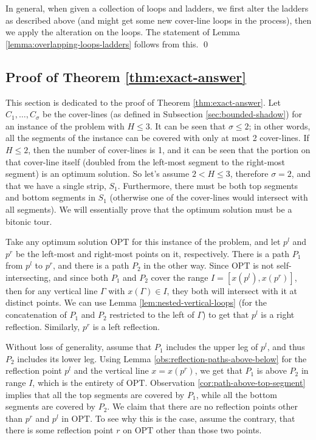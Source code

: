 \documentclass[10pt,a4paper]{amsart}
\theoremstyle{thmstyleone}
\newcommand{\OPT}{{\text{OPT}}}
\begin{document}
    In general, when given a collection of loops and ladders, we first alter the ladders as described above (and might get some new cover-line loops in the process), then we apply the alteration on the loops. The statement of Lemma \ref{lemma:overlapping-loops-ladders} follows from this. \qed

\subsection{Proof of Theorem \ref{thm:exact-answer}}\label{sec:exact-answer}
    This section is dedicated to the proof of Theorem \ref{thm:exact-answer}.
    Let $ C_1,\dots, C_\sigma $ be the cover-lines (as defined in Subsection \ref{sec:bounded-shadow}) for an instance of the problem with $ H\le 3 $. It can be seen that $ \sigma \le 2 $; in other words, all the segments of the instance can be covered with only at most 2 cover-lines. If $ H \le 2 $, then the number of cover-lines is 1, and it can be seen that the portion on that cover-line itself (doubled from the left-most segment to the right-most segment) is an optimum solution. So let's assume $ 2 < H \le 3 $, therefore $ \sigma = 2 $, and that we have a single strip, $ S_1 $. Furthermore, there must be both top segments and bottom segments in $ S_1 $ (otherwise one of the cover-lines would intersect with all segments). We will essentially prove that the optimum solution must be a bitonic tour.
	
	Take any optimum solution $ \OPT $ for this instance of the problem, and let $ p^l $ and $ p^r $ be the left-most and right-most points on it, respectively. There is a path $ P_1 $ from $ p^l $ to $ p^r $, and there is a path $ P_2 $ in the other way. Since $ \OPT $ is not self-intersecting, and since both $ P_1 $ and $ P_2 $ cover the range $ I = [x(p^l), x(p^r)] $, then for any vertical line $ \Gamma $ with $ x(\Gamma) \in I $, they both will intersect with it at distinct points. 
	We can use Lemma \ref{lem:nested-vertical-loops} (for the concatenation of $ P_1 $ and $ P_2 $ restricted to the left of $ \Gamma $) to get that $ p^l $ is a right reflection. Similarly, $ p^r $ is a left reflection. 
	
	Without loss of generality, assume that $ P_1 $ includes the upper leg of $ p^l $, and thus $ P_2 $ includes its lower leg. Using Lemma \ref{obs:reflection-paths-above-below} for the reflection point $ p^l $ and the vertical line $ x = x(p^r) $, we get that $ P_1 $ is above $ P_2 $ in range $ I $, which is the entirety of $ \OPT $.
	Observation \ref{cor:path-above-top-segment} implies that all the top segments are covered by $ P_1 $, while all the bottom segments are covered by $ P_2 $.
	We claim that there are no reflection points other than $ p^r $ and $ p^l $ in $ \OPT $. To see why this is the case, assume the contrary, that there is some reflection point $ r $ on $ \OPT $ other than those two points.
	
\end{document}
